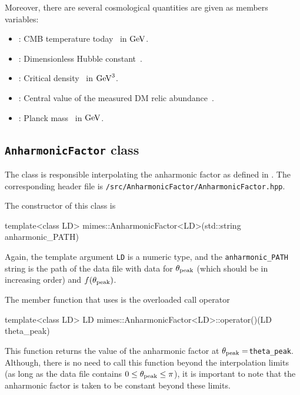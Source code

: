 \documentclass[11pt,a4paper]{article}
\begin{document}
Moreover, there are several cosmological quantities are given as members variables:
%
\begin{itemize}
	\item {}: CMB temperature today~\cite{Zyla:2020zbs} in ${\rm GeV}$.
	\item {}: Dimensionless Hubble constant~\cite{Zyla:2020zbs}.
	\item {}: Critical density~\cite{Zyla:2020zbs} in ${\rm GeV}^3$.
	\item {}: Central value of the measured DM relic abundance~\cite{Planck:2018vyg}.
	\item {}: Planck mass~\cite{Zyla:2020zbs} in ${\rm GeV}$.
\end{itemize}


\subsection{{\tt AnharmonicFactor} class}
%
The class  is responsible interpolating the anharmonic factor as defined in . The corresponding header file is {\tt \mimes/src/AnharmonicFactor/AnharmonicFactor.hpp}. 

The constructor of this class is
%
\begin{cpp}
	template<class LD>
	mimes::AnharmonicFactor<LD>(std::string anharmonic_PATH)
\end{cpp}
%
Again, the template argument {\tt LD} is a numeric type, and the {\tt anharmonic\_PATH} string is the path of the data file with data for $\theta_{\rm peak}{}$ (which should be in increasing order) and $f(\theta_{\rm peak}{})$.

The member function that \mimes uses is the overloaded call operator
%
\begin{cpp}
	template<class LD> LD mimes::AnharmonicFactor<LD>::operator()(LD theta_peak)
\end{cpp}
%
This function returns the value of the anharmonic factor at $\theta_{\rm peak}{}=${\tt theta\_peak}. Although, there is no need to call this function beyond the interpolation limits (as long as the data file contains $0\leq \theta_{\rm peak}{} \leq \pi$), it is important to note that the anharmonic factor is taken to be constant beyond these limits. 
\end{document}
